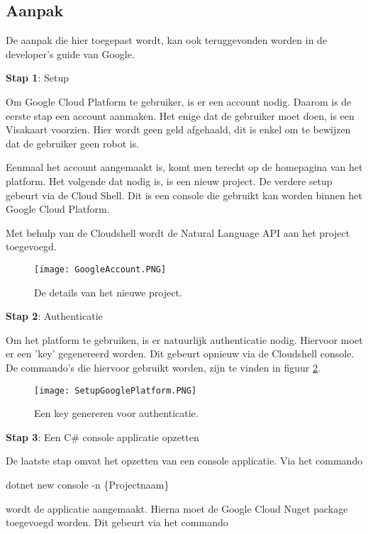 \subsection{Aanpak}
\label{aanpakgoogleplatform}

De aanpak die hier toegepast wordt, kan ook teruggevonden worden in de developer's guide van Google. \autocite{Codelabs2021}

\textbf{Stap 1}: Setup

Om Google Cloud Platform te gebruiker, is er een account nodig. Daarom is de eerste stap een account aanmaken. Het enige dat de gebruiker moet doen, is een Visakaart voorzien. Hier wordt geen geld afgehaald, dit is enkel om te bewijzen dat de gebruiker geen robot is. 

Eenmaal het account aangemaakt is, komt men terecht op de homepagina van het platform. Het volgende dat nodig is, is een nieuw project. De verdere setup gebeurt via de Cloud Shell. Dit is een console die gebruikt kan worden binnen het Google Cloud Platform. 

Met behulp van de \gls{Cloudshell} wordt de Natural Language API aan het project toegevoegd. 

\begin{figure}[!htbp]
    \texttt{[image: GoogleAccount.PNG]}
    \caption{\label{googleaccount}De details van het nieuwe project.}
\end{figure}
\FloatBarrier 

\textbf{Stap 2}: Authenticatie

Om het platform te gebruiken, is er natuurlijk authenticatie nodig. Hiervoor moet er een 'key' gegenereerd worden. Dit gebeurt opnieuw via de \gls{Cloudshell} console. De commando's die hiervoor gebruikt worden, zijn te vinden in figuur \ref{setupgoogleplatform}.

\begin{figure}[!htbp]
    \texttt{[image: SetupGooglePlatform.PNG]}
    \caption{\label{setupgoogleplatform}Een key genereren voor authenticatie.}
\end{figure}
\FloatBarrier 

\textbf{Stap 3}: Een C\# console applicatie opzetten

De laatste stap omvat het opzetten van een console applicatie. Via het commando 

dotnet new console -n \{Projectnaam\} 

wordt de applicatie aangemaakt. Hierna moet de Google Cloud Nuget \gls{package} toegevoegd worden. Dit gebeurt via het commando

